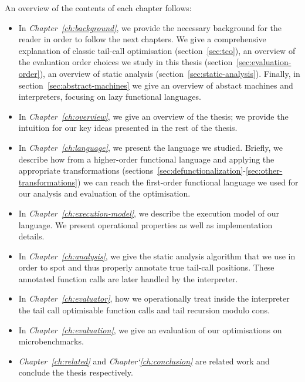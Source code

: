 \documentclass[diploma]{softlab-thesis}
\begin{document}
An overview of the contents of each chapter follows:
\begin{itemize}
  \item In \textit{Chapter~\ref{ch:background}}, we provide the necessary background for the reader in 
        order to follow the next chapters. We give a comprehensive explanation of classic 
        tail-call optimisation (section~\ref{sec:tco}), an overview of the evaluation order choices we study 
        in this thesis (section~\ref{sec:evaluation-order}), an overview of static analysis (section~\ref{sec:static-analysis}). Finally, 
        in section~\ref{sec:abstract-machines} we give an overview of abstact machines and interpreters, focusing on 
        lazy functional languages.

  \item In \textit{Chapter~\ref{ch:overview}}, we give an overview of the thesis; we provide the intuition 
        for our key ideas presented in the rest of the thesis.

  \item In \textit{Chapter~\ref{ch:language}}, we present the language we studied. Briefly, we describe 
        how from a higher-order functional language and applying the appropriate 
        transformations (sections~\ref{sec:defunctionalization}-\ref{sec:other-transformations}) we can reach the first-order functional 
        language we used for our analysis and evaluation of the optimisation.

  \item In \textit{Chapter~\ref{ch:execution-model}}, we describe the execution model of our language. We present operational 
        properties as well as implementation details.

  \item In \textit{Chapter~\ref{ch:analysis}}, we give the static analysis algorithm that we use in order to spot 
        and thus properly annotate true tail-call positions. These annotated function calls 
        are later handled by the interpreter.

  \item In \textit{Chapter~\ref{ch:evaluator}}, how we operationally treat inside the interpreter the 
        tail call optimisable function calls and tail recursion modulo cons.

  \item In \textit{Chapter~\ref{ch:evaluation}}, we give an evaluation of our optimisations on microbenchmarks.

  \item \textit{Chapter~\ref{ch:related}} and \textit{Chapter`\ref{ch:conclusion}} are related work and conclude the thesis respectively.

\end{itemize}
\end{document}
